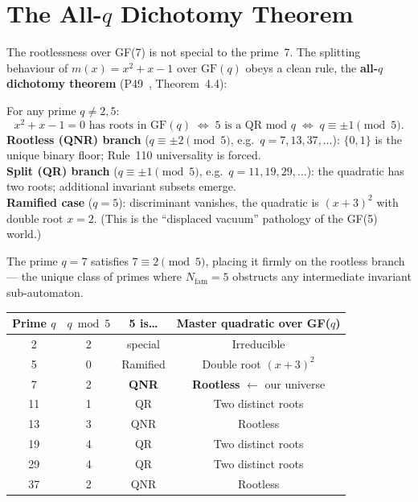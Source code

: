 \documentclass[11pt,a4paper]{article}
\newcommand{\term}[1]{\textbf{#1}}
\newcommand{\Nfam}{N_{\mathrm{fam}}}
\begin{document}
\section{The All-$q$ Dichotomy Theorem}
\label{sec:dichotomy}

The rootlessness over GF(7) is not special to the prime~7.  The splitting
behaviour of $m(x) = x^2 + x - 1$ over $\mathrm{GF}(q)$ obeys a clean rule,
the \term{all-$q$ dichotomy theorem} (P49~\cite{SpivackGTEPolynomialWolfram}, Theorem~4.4):

\begin{tcolorbox}[colback=boxorange,colframe=orange!60!black,
  title=All-$q$ dichotomy]
For any prime $q \neq 2, 5$:
\[
  x^2 + x - 1 = 0 \text{ has roots in } \mathrm{GF}(q)
  \;\iff\;
  5 \text{ is a QR mod } q
  \;\iff\;
  q \equiv \pm 1 \pmod{5}.
\]
\textbf{Rootless (QNR) branch} ($q \equiv \pm 2 \pmod 5$, e.g.\ $q = 7, 13, 37, \ldots$):
$\{0,1\}$ is the unique binary floor; Rule~110 universality is forced.\\[4pt]
\textbf{Split (QR) branch} ($q \equiv \pm 1 \pmod 5$, e.g.\ $q = 11, 19, 29, \ldots$):
the quadratic has two roots; additional invariant subsets emerge.\\[4pt]
\textbf{Ramified case} ($q = 5$): discriminant vanishes, the quadratic is
$(x+3)^2$ with double root $x = 2$.  (This is the ``displaced vacuum'' pathology
of the GF(5) world.)
\end{tcolorbox}

The prime $q = 7$ satisfies $7 \equiv 2 \pmod{5}$, placing it firmly on the
rootless branch — the unique class of primes where $\Nfam = 5$ obstructs
any intermediate invariant sub-automaton.

\medskip
\begin{center}
\begin{tabular}{cccc}
\toprule
Prime $q$ & $q \bmod 5$ & 5 is\ldots & Master quadratic over GF($q$) \\
\midrule
2  & 2 & special    & Irreducible \\
5  & 0 & Ramified   & Double root $(x+3)^2$ \\
7  & 2 & \textbf{QNR} & \textbf{Rootless} $\leftarrow$ our universe \\
11 & 1 & QR         & Two distinct roots \\
13 & 3 & QNR        & Rootless \\
19 & 4 & QR         & Two distinct roots \\
29 & 4 & QR         & Two distinct roots \\
37 & 2 & QNR        & Rootless \\
\bottomrule
\end{tabular}
\end{center}
\end{document}

